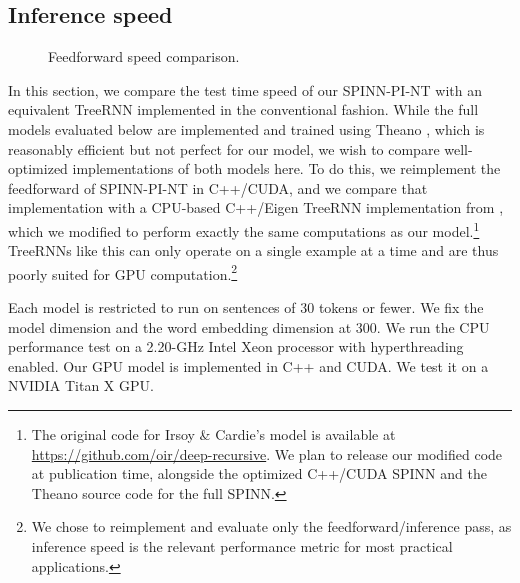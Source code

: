 \documentclass[11pt]{article}
\begin{document}
\subsection{Inference speed}
\label{sec:speed}

\begin{figure}
\centering
{}
\caption{Feedforward speed comparison.}
\label{fig:speed}
\end{figure}

In this section, we compare the test time speed of our SPINN-PI-NT with an equivalent TreeRNN implemented in the conventional fashion. While the full models evaluated below are implemented and trained using Theano \citep{bergstra+al:2010-scipy,Bastien-Theano-2012}, which is reasonably efficient but not perfect for our model, we wish to compare well-optimized implementations of both models here. To do this, we reimplement the feedforward of SPINN-PI-NT in C++/CUDA, and we compare that implementation with a CPU-based C++/Eigen TreeRNN implementation from \citet{irsoy2014deep}, which we modified to perform exactly the same computations as our model.\footnote{The original code for Irsoy \& Cardie's model is available at \url{https://github.com/oir/deep-recursive}. We plan to release our modified code at publication time, alongside the optimized C++/CUDA SPINN and the Theano source code for the full SPINN.} TreeRNNs like this can only operate on a single example at a time and are thus poorly suited for GPU computation.\footnote{We chose to reimplement and evaluate only the feedforward/inference pass, as inference speed is the relevant performance metric for most practical applications.}

Each model is restricted to run on sentences of 30 tokens or fewer. We fix the model dimension and the word embedding dimension at 300. We run the CPU performance test on a 2.20-GHz Intel Xeon processor with hyperthreading enabled. Our GPU model is implemented in C++ and CUDA. We test it on a NVIDIA Titan X GPU.
\end{document}

